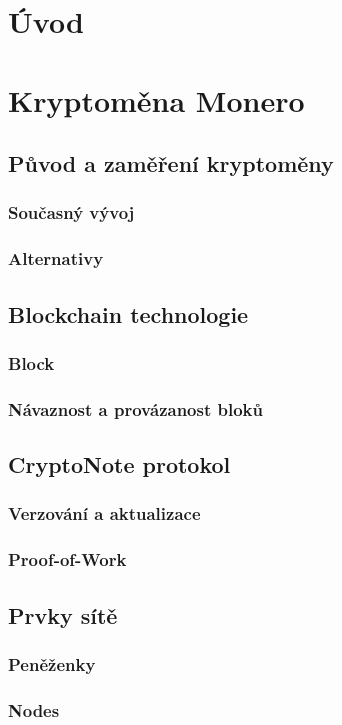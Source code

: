 \documentclass[
  printed, %
  table,   %
  nolof,     %
  nolot,     %
           oneside, color
]{fithesis3}
\begin{document}
\chapter{Úvod}
\chapter{Kryptoměna Monero}
\section{Původ a zaměření kryptoměny}
\subsection{Současný vývoj}
\subsection{Alternativy}
\section{Blockchain technologie}
\subsection{Block}
\subsection{Návaznost a provázanost bloků}
\section{CryptoNote protokol}
\subsection{Verzování a aktualizace}
\subsection{Proof-of-Work}
\section{Prvky sítě}
\subsection{Peněženky}
\subsection{Nodes}
\end{document}

